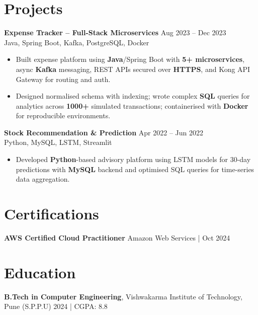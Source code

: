 \documentclass[10pt,letterpaper]{article}
\newcommand{\resumeSubheading}[4]{%
  \textbf{#1} \hfill #2 \\
  #3 \hfill #4 \\
}
\begin{document}
\section*{Projects}
\resumeSubheading{Expense Tracker -- Full-Stack Microservices}{Aug 2023 -- Dec 2023}{}{Java, Spring Boot, Kafka, PostgreSQL, Docker}
\begin{itemize}
    \item Built expense platform using \textbf{Java}/Spring Boot with \textbf{5+ microservices}, async \textbf{Kafka} messaging, REST APIs secured over \textbf{HTTPS}, and Kong API Gateway for routing and auth.
    \item Designed normalised schema with indexing; wrote complex \textbf{SQL} queries for analytics across \textbf{1000+} simulated transactions; containerised with \textbf{Docker} for reproducible environments.
\end{itemize}

\resumeSubheading{Stock Recommendation \& Prediction}{Apr 2022 -- Jun 2022}{}{Python, MySQL, LSTM, Streamlit}
\begin{itemize}
    \item Developed \textbf{Python}-based advisory platform using LSTM models for 30-day predictions with \textbf{MySQL} backend and optimised SQL queries for time-series data aggregation.
\end{itemize}

\section*{Certifications}
\textbf{AWS Certified Cloud Practitioner} \hfill Amazon Web Services \enspace | \enspace Oct 2024

\section*{Education}
\textbf{B.Tech in Computer Engineering}, Vishwakarma Institute of Technology, Pune (S.P.P.U) \hfill 2024 | CGPA: 8.8
\end{document}
